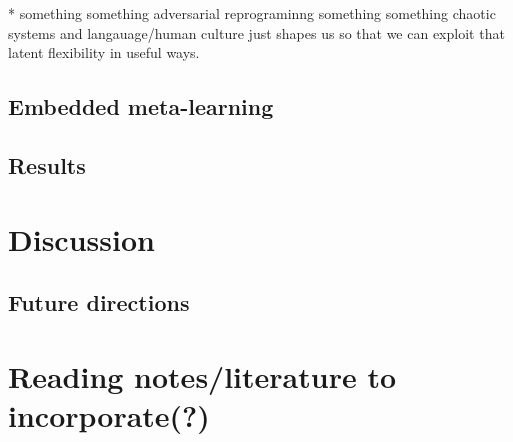 \documentclass[10pt]{article}
\begin{document}
* something something adversarial reprograminng \citep{Elsayed2018} something something chaotic systems and langauage/human culture just shapes us so that we can exploit that latent flexibility in useful ways.

\subsection{Embedded meta-learning}

\subsection{Results}

\section{Discussion}

\subsection{Future directions}


\section{Reading notes/literature to incorporate(?)}
\end{document}
